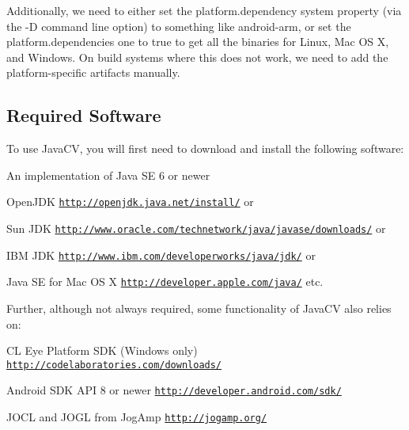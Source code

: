 Additionally, we need to either set the {\ttfamily platform.\+dependency} system property (via the {\ttfamily -\/\+D} command line option) to something like {\ttfamily android-\/arm}, or set the {\ttfamily platform.\+dependencies} one to {\ttfamily true} to get all the binaries for Linux, Mac O\+S X, and Windows. On build systems where this does not work, we need to add the platform-\/specific artifacts manually.

\subsection*{Required Software }

To use Java\+C\+V, you will first need to download and install the following software\+:


\begin{DoxyItemize}
\item An implementation of Java S\+E 6 or newer
\begin{DoxyItemize}
\item Open\+J\+D\+K \href{http://openjdk.java.net/install/}{\tt http\+://openjdk.\+java.\+net/install/} or
\item Sun J\+D\+K \href{http://www.oracle.com/technetwork/java/javase/downloads/}{\tt http\+://www.\+oracle.\+com/technetwork/java/javase/downloads/} or
\item I\+B\+M J\+D\+K \href{http://www.ibm.com/developerworks/java/jdk/}{\tt http\+://www.\+ibm.\+com/developerworks/java/jdk/} or
\item Java S\+E for Mac O\+S X \href{http://developer.apple.com/java/}{\tt http\+://developer.\+apple.\+com/java/} etc.
\end{DoxyItemize}
\end{DoxyItemize}

Further, although not always required, some functionality of Java\+C\+V also relies on\+:


\begin{DoxyItemize}
\item C\+L Eye Platform S\+D\+K (Windows only) \href{http://codelaboratories.com/downloads/}{\tt http\+://codelaboratories.\+com/downloads/}
\item Android S\+D\+K A\+P\+I 8 or newer \href{http://developer.android.com/sdk/}{\tt http\+://developer.\+android.\+com/sdk/}
\item J\+O\+C\+L and J\+O\+G\+L from Jog\+Amp \href{http://jogamp.org/}{\tt http\+://jogamp.\+org/}
\end{DoxyItemize}

